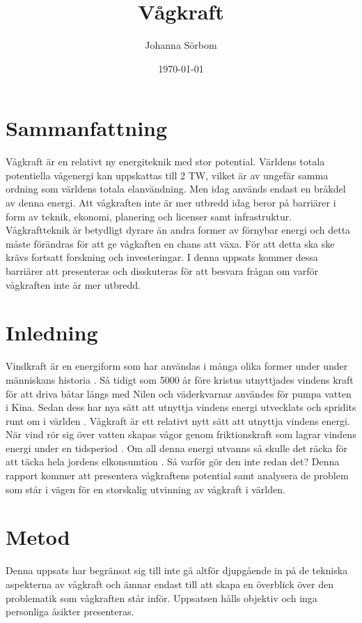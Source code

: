 \documentclass[10pt,a4paper,oneside]{article}
\newcommand{\titlepicture}[2][]{%
  \renewcommand\placetitlepicture{%
    \texttt{[image: \#2]}\par\medskip
  }%
}
\newcommand{\placetitlepicture}{}
\begin{document}
\title{Vågkraft \\ 
\large }
\author{\small Johanna Sörbom}
\date{\small \today}
\titlepicture[width=3in]{Wave}

\maketitle
\newpage

\section{Sammanfattning}
Vågkraft är en relativt ny energiteknik med stor potential. Världens totala potentiella vågenergi kan uppskattas till 2 TW, vilket är av ungefär samma ordning som världens totala elanvändning. Men idag används endast en bråkdel av denna energi. Att vågkraften inte är mer utbredd idag beror på barriärer i form av teknik, ekonomi, planering och licenser samt infrastruktur. Vågkraftteknik är betydligt dyrare än andra former av förnybar energi och detta måste förändras för att ge vågkaften en chans att växa. För att detta ska ske krävs fortsatt forskning och investeringar. I denna uppsats kommer dessa barriärer att presenteras och disskuteras för att besvara frågan om varför vågkraften inte är mer utbredd.  \newpage

\tableofcontents
\newpage

\section{Inledning}
Vindkraft är en energiform som har användas i många olika former under under människans historia \cite{Elliott}. Så tidigt som 5000 år före kristus utnyttjades vindens kraft för att driva båtar längs med Nilen och väderkvarnar användes för pumpa vatten i Kina. Sedan dess har nya sätt att utnyttja vindens energi utvecklats och spridits runt om i världen \cite{WEF}. Vågkraft är ett relativt nytt sätt att utnyttja vindens energi. När vind rör sig över vatten skapas vågor genom friktionskraft som lagrar vindens energi under en tidsperiod \cite{Elliott}. Om all denna energi utvanns så skulle det räcka för att täcka hela jordens elkonsumtion \cite{Cruz}. Så varför gör den inte redan det? Denna rapport kommer att presentera vågkraftens potential samt analysera de problem som står i vägen för en storskalig utvinning av vågkraft i världen. 

\section{Metod}
Denna uppsats har begränsat sig till inte gå altför djupgående in på de tekniska aspekterna av vågkraft och ämnar endast till att skapa en överblick över den problematik som vågkraften står inför. Uppsatsen hålls objektiv och inga personliga åsikter presenteras. 
\end{document}
